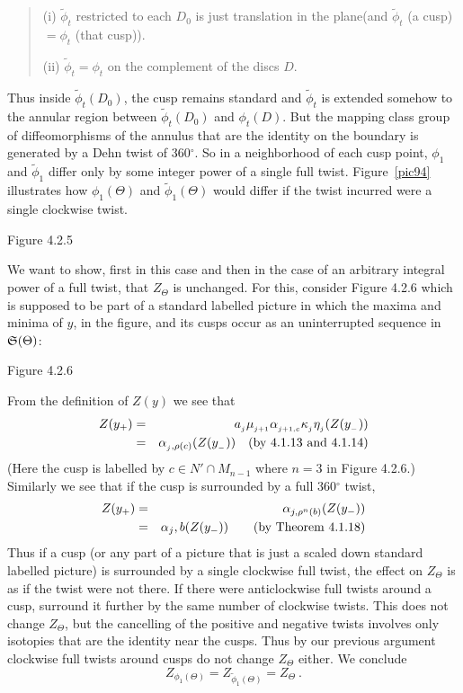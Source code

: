 \begin{verse}
(i) $\tilde\phi_t$ restricted to each $D_0$ is just
translation in the plane\newline (and $\tilde\phi_t$ (a cusp)
$=\phi_t$ (that cusp)).

(ii) $\tilde\phi_t=\phi_t$ on the complement of the discs
$D$.
\end{verse}
Thus inside $\tilde\phi_t(D_0)$, the cusp remains standard and
$\tilde\phi_t$ is extended somehow to the annular region between
$\tilde\phi_t(D_0)$ and $\phi_t(D)$.  But the mapping class group
of diffeomorphisms of the annulus that are the identity on the
boundary is generated by a Dehn twist of 360${}^\circ$. So in a
neighborhood of each cusp point, $\phi_1$ and $\tilde\phi_1$ differ
only by some integer power of a single full twist. Figure~\ref{pic94}
illustrates  how $\phi_1(\Theta)$ and $\tilde\phi_1(\Theta)$ would
differ if the twist incurred were a single clockwise twist.
\[
        
\]
\begin{center}
	Figure 4.2.5
\end{center}
\bs We want to show, first in this case and then in the case of an
arbitrary integral power of a full twist, that $Z_{\Theta}$ is
unchanged. For this, consider Figure 4.2.6 which is supposed to be
part of a standard labelled picture in which the maxima and minima
of $y$, in the figure, and its cusps occur as an uninterrupted
sequence in
$\frak S(\Theta)$:
\[
        
\]
\begin{center}
	Figure 4.2.6
\end{center}

\bs\ni From the definition of $Z(y)$ we see that
\begin{eqnarray*}
Z(y_+) & = & a_{{}_j}\mu_{{}_{j+1}} \alpha_{{}_{j+1,c}} \kappa_{{}_j}\eta_{{}_j} (Z(y_{{}_-})) \\ 
& = &\alpha_{{}_j,\rho(c)} (Z(y_{{}_-})) \quad \mbox{(by 4.1.13 and 4.1.14)}
\end{eqnarray*}
(Here the cusp is labelled by $c\in N'\cap M_{n-1}$ where
$n=3$ in Figure 4.2.6.) Similarly we see that if the cusp is
surrounded by a full 360${}^\circ$ twist,
\begin{eqnarray*}
Z(y_+) & = & \alpha_{j,\rho^n(b)} (Z(y_-)) \\
& = & \alpha_j, b (Z(y_-)) \qquad \mbox{(by Theorem  4.1.18)}
\end{eqnarray*}
Thus if a cusp  (or any part of a picture that is just a scaled
down standard labelled picture) is surrounded by a single clockwise
full twist, the effect on $Z_{\Theta}$ is as if the twist were not
there. If there were anticlockwise full twists around a cusp,
surround it further by the same number of clockwise twists. This
does not change
$Z_{\Theta}$, but the cancelling of the positive and negative
twists involves only isotopies that are the identity near the
cusps. Thus by our previous argument clockwise full twists around
cusps do not change
$Z_{\Theta}$ either. We conclude
\[
Z_{\phi_1(\Theta)} = Z_{\tilde\phi_1(\Theta)} =Z_{\Theta} \ .
\]

